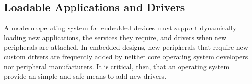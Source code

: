


\subsection{Loadable Applications and Drivers}

A modern operating system for embedded devices must support dynamically
loading new applications, the services they require, and drivers when new
peripherals are attached.
In embedded designs, new peripherals that require new custom drivers are
frequently added by neither core operating system developers nor peripheral
manufacturers. It is critical, then, that an operating system provide an
simple and safe means to add new drivers.




